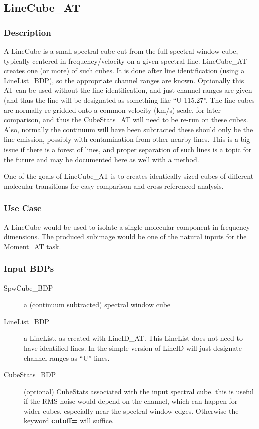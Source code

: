 
\subsection{LineCube\_AT}

\subsubsection{Description}

A LineCube is a small spectral cube cut from the full spectral window cube,
typically centered in frequency/velocity on a given spectral line.
LineCube\_AT creates one (or more) of such cubes. It is done
after line identification (using a LineList\_BDP), so the appropriate channel ranges are
known.  Optionally this AT can be used without the line identification, and
just channel ranges are given (and thus the line will be designated as something
like ``U-115.27''.
The line cubes are normally re-gridded onto a
common velocity (km/s) scale, for later comparison,
and thus the CubeStats\_AT will need to be re-run
on these cubes. Also, normally the continuum will have been subtracted
these should only be the line emission, possibly with contamination from
other nearby lines. This is a big issue if there is a forest of lines,
and proper separation of such lines is a topic for the future and may be 
documented here as well with a method.

One of the goals of LineCube\_AT is to creates identically sized cubes of
different molecular transitions for easy comparison and cross referenced analysis.

\subsubsection{Use Case}
A LineCube would be used to isolate a single molecular component in frequency dimensions. The produced subimage would be one of the natural inputs for the Moment\_AT task.

\subsubsection{Input BDPs}

\begin{description}
\item[SpwCube\_BDP] a (continuum subtracted) spectral window cube

\item[LineList\_BDP] a LineList, as created with LineID\_AT. This LineList does not need
to have identified lines. In the simple version of LineID will just designate
channel ranges as ``U'' lines.

\item[CubeStats\_BDP]  (optional) CubeStats associated with the input spectral cube.
this is useful if the RMS noise would depend on the channel, which can happen for wider cubes,
especially near the spectral window edges. Otherwise the keyword {\bf cutoff=} will suffice.
\end{description}

